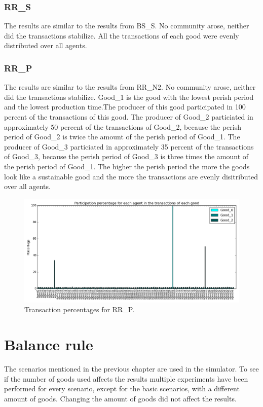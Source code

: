\documentclass[twoside,openright]{uva-bachelor-thesis}
\begin{document}
\subsubsection{RR\_S}
The results are similar to the results from BS\_S. No community arose, neither did the transactions stabilize. All the transactions of each good were evenly distributed over all agents. 

\subsubsection{RR\_P}
The results are similar to the results from RR\_N2. No community arose, neither did the transactions stabilize. Good\_1 is the good with the lowest perish period and the lowest production time.The producer of this good participated in 100 percent of the transactions of this good. The producer of Good\_2 particiated in approximately 50  percent of the transactions of Good\_2, because the perish period of Good\_2 is twice the amount of the perish period of Good\_1. The producer of Good\_3 particiated in approximately 35 percent of the transactions of Good\_3, because the perish period  of Good\_3 is three times the amount of the perish period of Good\_1. The higher the perish period the more the goods look like a sustainable good and the more the transactions are evenly disitributed over all agents.\\
\begin{figure}[h!]
  \centering
    \includegraphics[scale=0.4]{Simulation_figures/RR_P/Figure1_20k}
  \caption{Transaction percentages for RR\_P.}
\end{figure}


\section{Balance rule}
The scenarios mentioned in the previous chapter are used in the simulator. To see if the number of goods used affects the results multiple experiments have been performed for every scenario, except for the basic scenarios, with a different amount of goods. Changing the amount of goods did not affect the results.
\end{document}
